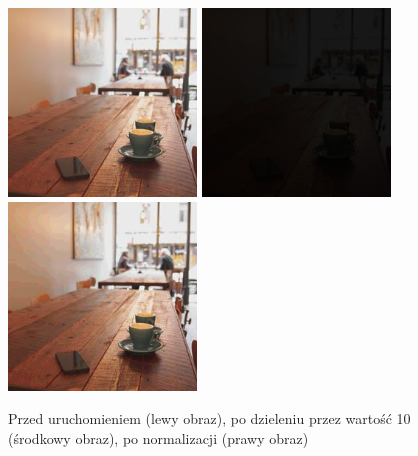 \documentclass[a4paper,12pt]{book}
\begin{document}
\begin{figure}[H]
	\caption{Przed uruchomieniem (lewy obraz), po dzieleniu przez wartość 10 (środkowy obraz), po normalizacji (prawy obraz)}
	\includegraphics[width=5cm, height=5cm]{coffee-unmodified.jpg}
	\includegraphics[width=5cm, height=5cm]{3-5/divide-color-const-coffee-10.png}
	\includegraphics[width=5cm, height=5cm]{3-5/divide-color-const-coffee-10-norm.png}
\end{figure}
\end{document}
